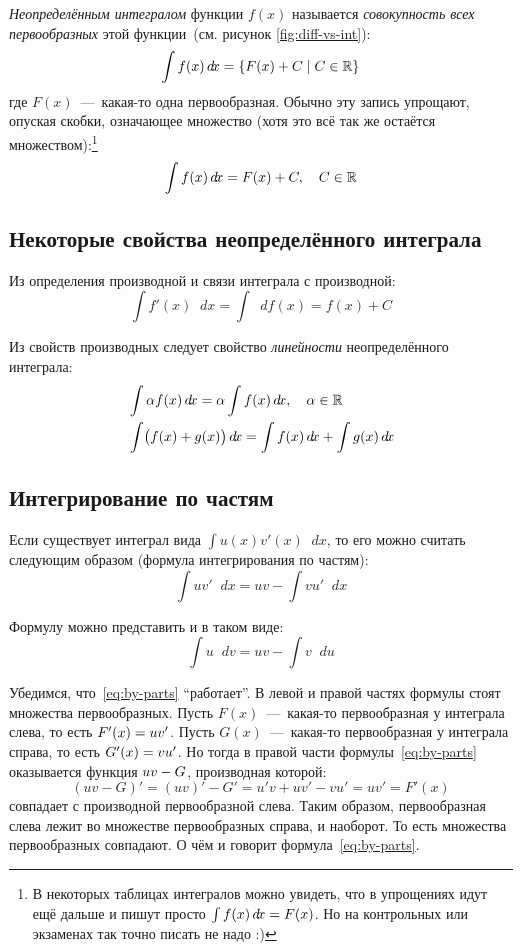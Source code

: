 \documentclass[a4paper,12pt]{article}
\newcommand{\diff}{\mathop{}\!d\!}
\begin{document}
  \emph{Неопределённым интегралом} функции $f(x)$ называется \emph{совокупность всех первообразных} этой функции~(см. рисунок \ref{fig:diff-vs-int}):
  \[
    \int f(x) \diff x = \{F(x) + C \mid C \in \RR\}
  \]
  где $F(x)$~---~какая-то одна первообразная.
  Обычно эту запись упрощают, опуская скобки, означающее множество (хотя это всё так же остаётся множеством):\footnote{
    В некоторых таблицах интегралов можно увидеть, что в упрощениях идут ещё дальше и пишут просто $\int f(x) \diff x \hm= F(x)$.
    Но на контрольных или экзаменах так точно писать не надо :)
  }
  \[
    \int f(x) \diff x = F(x) + C,\quad C \in \RR
  \]
  
  
  \subsection{Некоторые свойства неопределённого интеграла}
  
  Из определения производной и связи интеграла с производной:
  \[
    \int f'(x) \diff x = \int \diff f(x) = f(x) + C
  \]
  
  Из свойств производных следует свойство \emph{линейности} неопределённого интеграла:
  \[
    \left.
      \begin{aligned}
        &\int \alpha f(x) \diff x = \alpha \int f(x) \diff x,\quad \alpha \in \RR\\
        &\int \bigl(f(x) + g(x)\bigr) \diff x = \int f(x) \diff x + \int g(x) \diff x
      \end{aligned}
    \right.
  \]
  
  
  \subsection{Интегрирование по частям}
  
  Если существует интеграл вида $\int u(x) v'(x) \diff x$, то его можно считать следующим образом (формула интегрирования по частям):
  \begin{equation}\label{eq:by-parts}
    \int u v' \diff x = u v - \int v u' \diff x
  \end{equation}
  
  Формулу можно представить и в таком виде:
  \begin{equation}
    \int u \diff v = u v - \int v \diff u
  \end{equation}
  
  Убедимся, что~\eqref{eq:by-parts} ``работает''.
  В левой и правой частях формулы стоят множества первообразных.
  Пусть $F(x)$~---~какая-то первообразная у интеграла слева, то есть $F'(x) \hm= u v'$.
  Пусть $G(x)$~---~какая-то первообразная у интеграла справа, то есть $G'(x) \hm= vu'$.
  Но тогда в правой части формулы~\eqref{eq:by-parts} оказывается функция $uv \hm- G$, производная которой:
  \[
    (uv - G)' = (uv)' - G' = u'v + uv' - vu' = uv' = F'(x)
  \]
  совпадает с производной первообразной слева.
  Таким образом, первообразная слева лежит во множестве первообразных справа, и наоборот.
  То есть множества первообразных совпадают.
  О чём и говорит формула~\eqref{eq:by-parts}.
  
\end{document}
